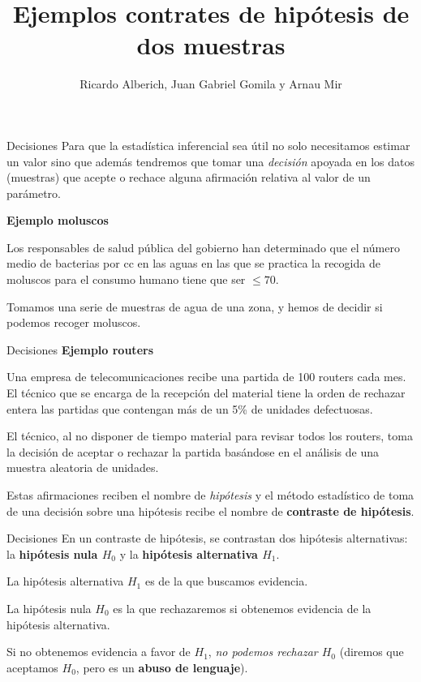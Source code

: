 \documentclass[
  ignorenonframetext,
]{beamer}
\title{Ejemplos contrates de hipótesis de dos muestras}
\author{Ricardo Alberich, Juan Gabriel Gomila y Arnau Mir}
\date{}
\begin{document}
\frame{\titlepage}

\begin{frame}{Decisiones}
\protect\hypertarget{decisiones}{}
Para que la estadística inferencial sea útil no solo necesitamos estimar
un valor sino que además tendremos que tomar una \emph{decisión} apoyada
en los datos (muestras) que acepte o rechace alguna afirmación relativa
al valor de un parámetro.

\textbf{Ejemplo moluscos}

Los responsables de salud pública del gobierno han determinado que el
número medio de bacterias por cc en las aguas en las que se practica la
recogida de moluscos para el consumo humano tiene que ser \(\leq 70\).

Tomamos una serie de muestras de agua de una zona, y hemos de decidir si
podemos recoger moluscos.
\end{frame}

\begin{frame}{Decisiones}
\protect\hypertarget{decisiones-1}{}
\textbf{Ejemplo routers}

Una empresa de telecomunicaciones recibe una partida de 100 routers cada
mes. El técnico que se encarga de la recepción del material tiene la
orden de rechazar entera las partidas que contengan más de un 5\% de
unidades defectuosas.

El técnico, al no disponer de tiempo material para revisar todos los
routers, toma la decisión de aceptar o rechazar la partida basándose en
el análisis de una muestra aleatoria de unidades.

Estas afirmaciones reciben el nombre de \emph{hipótesis} y el método
estadístico de toma de una decisión sobre una hipótesis recibe el nombre
de \textbf{contraste de hipótesis}.
\end{frame}

\begin{frame}{Decisiones}
\protect\hypertarget{decisiones-2}{}
En un contraste de hipótesis, se contrastan dos hipótesis alternativas:
la \textbf{hipótesis nula \(H_0\)} y la \textbf{hipótesis alternativa
\(H_{1}\)}.

La hipótesis alternativa \(H_{1}\) es de la que buscamos evidencia.

La hipótesis nula \(H_{0}\) es la que rechazaremos si obtenemos
evidencia de la hipótesis alternativa.

Si no obtenemos evidencia a favor de \(H_1\), \emph{no podemos rechazar
\(H_0\)} (diremos que aceptamos \(H_0\), pero es un \textbf{abuso de
lenguaje}).
\end{frame}
\end{document}
